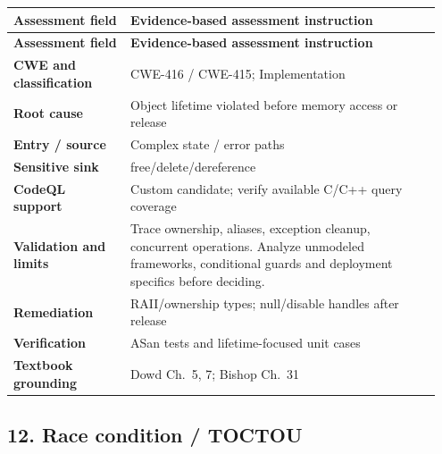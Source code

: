 \documentclass[11pt,letterpaper,oneside]{book}
\begin{document}
\small
\setlength{\tabcolsep}{2pt}
\renewcommand{\arraystretch}{1.18}
\begin{longtable}{>{\raggedright\arraybackslash}p{0.26\linewidth}>{\raggedright\arraybackslash}p{0.69\linewidth}}
\toprule
\textbf{Assessment field} & \textbf{Evidence-based assessment instruction}\\
\midrule
\endfirsthead
\toprule
\textbf{Assessment field} & \textbf{Evidence-based assessment instruction}\\
\midrule
\endhead
\textbf{CWE and classification} & CWE-416 / CWE-415; Implementation\\
\textbf{Root cause} & Object lifetime violated before memory access or release\\
\textbf{Entry / source} & Complex state / error paths\\
\textbf{Sensitive sink} & free/delete/dereference\\
\textbf{CodeQL support} & Custom candidate; verify available C/C++ query coverage\\
\textbf{Validation and limits} & Trace ownership, aliases, exception cleanup, concurrent operations. Analyze unmodeled frameworks, conditional guards and deployment specifics before deciding.\\
\textbf{Remediation} & RAII/ownership types; null/disable handles after release\\
\textbf{Verification} & ASan tests and lifetime-focused unit cases\\
\textbf{Textbook grounding} & Dowd Ch.~5, 7; Bishop Ch.~31\\
\bottomrule
\end{longtable}
\normalsize

\subsection{12. Race condition / TOCTOU}
\end{document}
